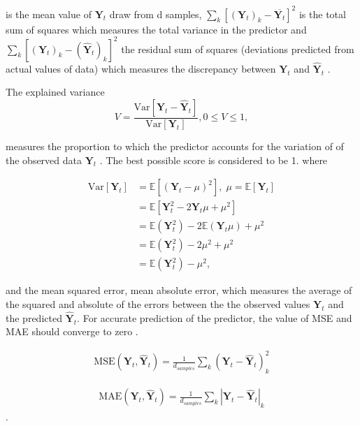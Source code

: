 is the mean value of $\textbf{Y}_{t}$ draw from d samples,  
 $\sum_{k}\left[(\textbf{Y}_{t})_{k}-\overline{\textbf{Y}_{t}}\right]^2$ is the total sum of squares which measures the total variance in the predictor and $\sum_{k} \left[(\textbf{Y}_{t})_{k}-(\widehat{\textbf{Y}}_{t})_{k}\right]^2$ the residual sum of squares (deviations predicted from actual values of data) which measures the discrepancy between $\textbf{Y}_{t}$ and $\widehat{\textbf{Y}}_{t}$ \citep{james2013introduction}.

The explained variance
\begin{equation}
V=\frac{\text{Var}\left[\textbf{Y}_{t}-\widehat{\textbf{Y}}_{t} \right]}{\text{Var}\left[\textbf{Y}_{t}\right]}, 0 \leq V \leq 1, 
\label{ExV}
\end{equation}  

measures the proportion to which the predictor accounts for the variation of of the observed data $\textbf{Y}_{t}$ \citep{bellinger2016fundamental}. The best possible score is considered to be 1. where 

\begin{align*}
\text{Var}\left[\textbf{Y}_{t}\right]&=\mathbb{E}\left[(\textbf{Y}_{t}-\mu)^2\right],\; \mu=\mathbb{E}\left[\textbf{Y}_{t}\right]\\
&=\mathbb{E}\left[\textbf{Y}_{t}^2-2\textbf{Y}_{t} \mu +\mu^2\right]\\
&=\mathbb{E}(\textbf{Y}_{t}^2)- 2\mathbb{E}(\textbf{Y}_{t} \mu) + \mu^2\\
&=\mathbb{E}(\textbf{Y}_{t}^2)-2 \mu^2 + \mu^2\\
&=\mathbb{E}(\textbf{Y}_{t}^2)-\mu^2,
\end{align*}
\citep{fortmann2012understanding}

and the mean squared error, mean absolute error, which measures the average of the squared and absolute of the errors between the the observed values $\textbf{Y}_{t}$ and the predicted $\widehat{\textbf{Y}}_{t}$. For accurate prediction of the predictor, the value of MSE and MAE should converge to zero \citep{james2013introduction}. 

\begin{align}
\text{MSE}\left(\textbf{Y}_{t},\widehat{\textbf{Y}}_{t} \right)=\frac{1}{d_{samples}} \sum_{k} (\textbf{Y}_{t}-\widehat{\textbf{Y}}_{t})^2_{k}
\label{MSE}
\end{align}

\begin{align}
\text{MAE}\left(\textbf{Y}_{t},\widehat{\textbf{Y}}_{t} \right)=\frac{1}{d_{samples}} \sum_{k} \left|\textbf{Y}_{t}-\widehat{\textbf{Y}}_{t}\right|_{k}
\label{MAE}
\end{align}.

